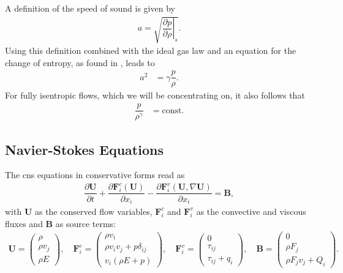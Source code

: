 		A definition of the speed of sound is given by
		\begin{align}
			a = \sqrt{\left.\dfrac{\partial p}{\partial \rho}\right|_s}.
		\end{align}
		Using this definition combined with the ideal gas law and an equation for the change of entropy, as found in \textcite{mueller2014}, leads to
		\begin{align}
			a^2 &= \gamma \dfrac{p}{\rho}.
		\end{align}
		For fully isentropic flows, which we will be concentrating on, it also follows that 
		\begin{align}
				\dfrac{p}{\rho^\gamma} &= \text{const}.
		\end{align}
		
		\subsection{Navier-Stokes Equations}
		The \gls{cns} equations in conservative forms read as 
		\begin{align}
			\dfrac{\partial \mathbf{U}}{\partial t} + \dfrac{\partial \mathbf{F}_i^c(\mathbf{U})}{\partial x_i} - \dfrac{\partial \mathbf{F}_i^v(\mathbf{U}, \nabla\mathbf{U})}{\partial x_i} = \mathbf{B},
		\end{align}
		with $\mathbf{U}$ as the conserved flow variables, $\mathbf{F}_i^c$ and $\mathbf{F}_i^v$ as the convective and viscous fluxes and $\mathbf{B}$ as source terms:
		\begin{align}
			\mathbf{U} = 
				\begin{pmatrix}
				\rho \\
				\rho v_j \\
				\rho E
				\end{pmatrix} , \quad
			\mathbf{F}_i^c = 
				\begin{pmatrix}
				\rho v_i \\
				\rho v_i v_j + p \delta_{ij}\\
				v_i(\rho E + p)
				\end{pmatrix} , \quad
			\mathbf{F}_i^v = 
				\begin{pmatrix}
				0 \\
				\tau_{ij}\\
				\tau_{ij} + q_i
				\end{pmatrix} , \quad
			\mathbf{B} = 
				\begin{pmatrix}
				0 \\
				\rho F_j\\
				\rho F_j v_j + Q_i
				\end{pmatrix}.
		\end{align}

